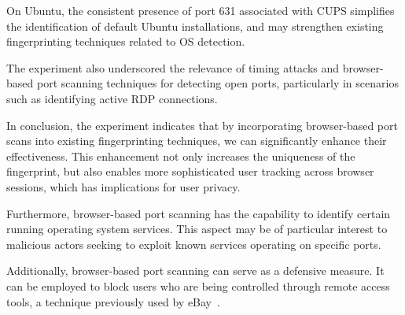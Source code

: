 On Ubuntu, the consistent presence of port 631 associated with CUPS simplifies the identification of default Ubuntu installations, and may strengthen existing fingerprinting techniques related to OS detection.

The experiment also underscored the relevance of timing attacks and browser-based port scanning techniques for detecting open ports, particularly in scenarios such as identifying active RDP connections.

In conclusion, the experiment indicates that by incorporating browser-based port scans into existing fingerprinting techniques, we can significantly enhance their effectiveness. This enhancement not only increases the uniqueness of the fingerprint, but also enables more sophisticated user tracking across browser sessions, which has implications for user privacy.

Furthermore, browser-based port scanning has the capability to identify certain running operating system services. This aspect may be of particular interest to malicious actors seeking to exploit known services operating on specific ports.

Additionally, browser-based port scanning can serve as a defensive measure. It can be employed to block users who are being controlled through remote access tools, a technique previously used by eBay~\cite{ebay_port_scans}.





     
